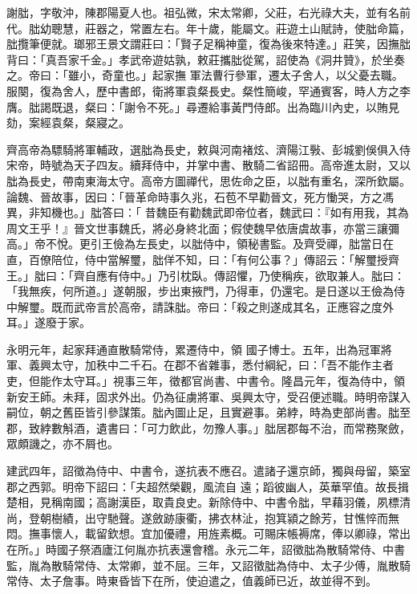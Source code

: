 
\begin{pinyinscope}

 謝朏，字敬沖，陳郡陽夏人也。祖弘微，宋太常卿，父莊，右光祿大夫，並有名前代。朏幼聰慧，莊器之，常置左右。年十歲，能屬文。莊遊土山賦詩，使朏命篇，朏攬筆便就。瑯邪王景文謂莊曰：「賢子足稱神童，復為後來特達。」莊笑，因撫朏背曰：「真吾家千金。」孝武帝遊姑孰，敕莊攜朏從駕，詔使為《洞井贊》，於坐奏之。帝曰：「雖小，奇童也。」起家撫
 軍法曹行參軍，遷太子舍人，以父憂去職。服闋，復為舍人，歷中書郎，衛將軍袁粲長史。粲性簡峻，罕通賓客，時人方之李膺。朏謁既退，粲曰：「謝令不死。」尋遷給事黃門侍郎。出為臨川內史，以賄見劾，案經袁粲，粲寢之。



 齊高帝為驃騎將軍輔政，選朏為長史，敕與河南褚炫、濟陽江斅、彭城劉俁俱入侍宋帝，時號為天子四友。續拜侍中，并掌中書、散騎二省詔冊。高帝進太尉，又以朏為長史，帶南東海太守。高帝方圖禪代，思佐命之臣，以朏有重名，深所欽屬。論魏、晉故事，因曰：「晉革命時事久兆，石苞不早勸晉文，死方慟哭，方之馮異，非知機也。」朏答曰：「
 昔魏臣有勸魏武即帝位者，魏武曰：『如有用我，其為周文王乎！』晉文世事魏氏，將必身終北面；假使魏早依唐虞故事，亦當三讓彌高。」帝不悅。更引王儉為左長史，以朏侍中，領秘書監。及齊受禪，朏當日在直，百僚陪位，侍中當解璽，朏佯不知，曰：「有何公事？」傳詔云：「解璽授齊王。」朏曰：「齊自應有侍中。」乃引枕臥。傳詔懼，乃使稱疾，欲取兼人。朏曰：「我無疾，何所道。」遂朝服，步出東掖門，乃得車，仍還宅。是日遂以王儉為侍中解璽。既而武帝言於高帝，請誅朏。帝曰：「殺之則遂成其名，正應容之度外耳。」遂廢于家。



 永明元年，起家拜通直散騎常侍，累遷侍中，領
 國子博士。五年，出為冠軍將軍、義興太守，加秩中二千石。在郡不省雜事，悉付綱紀，曰：「吾不能作主者吏，但能作太守耳。」視事三年，徵都官尚書、中書令。隆昌元年，復為侍中，領新安王師。未拜，固求外出。仍為征虜將軍、吳興太守，受召便述職。時明帝謀入嗣位，朝之舊臣皆引參謀策。朏內圖止足，且實避事。弟綍，時為吏部尚書。朏至郡，致綍數斛酒，遺書曰：「可力飲此，勿豫人事。」朏居郡每不治，而常務聚斂，眾頗譏之，亦不屑也。



 建武四年，詔徵為侍中、中書令，遂抗表不應召。遣諸子還京師，獨與母留，築室郡之西郭。明帝下詔曰：「夫超然榮觀，風流自
 遠；蹈彼幽人，英華罕值。故長揖楚相，見稱南國；高謝漢臣，取貴良史。新除侍中、中書令朏，早藉羽儀，夙標清尚，登朝樹績，出守馳聲。遂斂跡康衢，拂衣林沚，抱箕潁之餘芳，甘憔悴而無悶。撫事懷人，載留欽想。宜加優禮，用旌素概。可賜床帳褥席，俸以卿祿，常出在所。」時國子祭酒廬江何胤亦抗表還會稽。永元二年，詔徵朏為散騎常侍、中書監，胤為散騎常侍、太常卿，並不屈。三年，又詔徵朏為侍中、太子少傅，胤散騎常侍、太子詹事。時東昏皆下在所，使迫遣之，值義師已近，故並得不到。




\end{pinyinscope}
